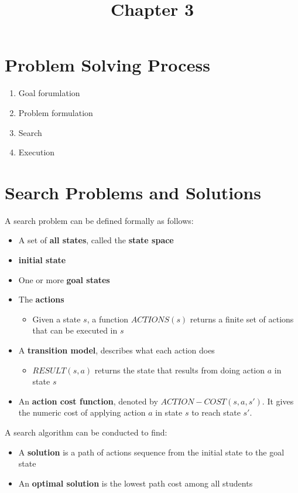 \documentclass[12pt]{article}
\title{Chapter 3}
\author{}
\date{}
\begin{document}
\maketitle

\section{Problem Solving Process}

\begin{enumerate}
    \item Goal forumlation
    \item Problem formulation
    \item Search
    \item Execution
\end{enumerate}

\section{Search Problems and Solutions}

A search problem can be defined formally as follows:
\begin{itemize}
    \item A set of \textbf{all states}, called the \textbf{state space}
    \item \textbf{initial state}
    \item One or more \textbf{goal states}
    \item The \textbf{actions}
    \begin{itemize}
        \item Given a state $s$, a function $ACTIONS(s)$ returns a finite set of actions that can be executed in $s$
    \end{itemize}
    \item A \textbf{transition model}, describes what each action does
    \begin{itemize}
        \item $RESULT(s,a)$ returns the state that results from doing action $a$ in state $s$
    \end{itemize}
    \item An \textbf{action cost function}, denoted by $ACTION-COST(s, a, s')$. It gives the numeric cost of applying action $a$ in state $s$ to reach state $s'$.
\end{itemize}

A search algorithm can be conducted to find:
\begin{itemize}
    \item A \textbf{solution} is a path of actions sequence from the initial state to the goal state
    \item An \textbf{optimal solution} is the lowest path cost among all students
\end{itemize}
\end{document}
